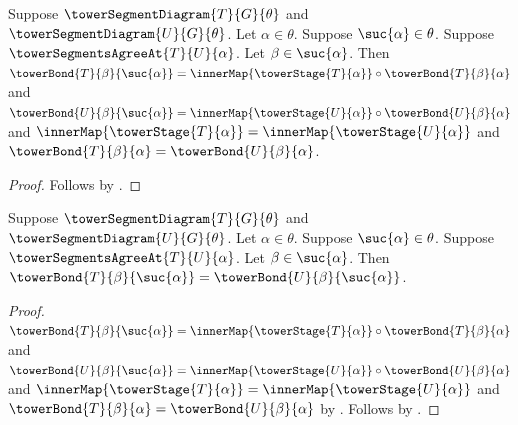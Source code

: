 \begin{proposition}\label{tower_successor_old_bond_agreement_factors}
    Suppose $\towerSegmentDiagram{T}{G}{\theta}$ and
        $\towerSegmentDiagram{U}{G}{\theta}$.
    Let $\alpha\in\theta$.
    Suppose $\suc{\alpha}\in\theta$.
    Suppose $\towerSegmentsAgreeAt{T}{U}{\alpha}$.
    Let $\beta\in\suc{\alpha}$.
    Then $\towerBond{T}{\beta}{\suc{\alpha}}=
            \innerMap{\towerStage{T}{\alpha}}\circ
                \towerBond{T}{\beta}{\alpha}$ and
        $\towerBond{U}{\beta}{\suc{\alpha}}=
            \innerMap{\towerStage{U}{\alpha}}\circ
                \towerBond{U}{\beta}{\alpha}$ and
        $\innerMap{\towerStage{T}{\alpha}}=
            \innerMap{\towerStage{U}{\alpha}}$ and
        $\towerBond{T}{\beta}{\alpha}=
            \towerBond{U}{\beta}{\alpha}$.
\end{proposition}
\begin{proof}
    Follows by
        .
\end{proof}

\begin{proposition}\label{tower_successor_old_bond_agreement}
    Suppose $\towerSegmentDiagram{T}{G}{\theta}$ and
        $\towerSegmentDiagram{U}{G}{\theta}$.
    Let $\alpha\in\theta$.
    Suppose $\suc{\alpha}\in\theta$.
    Suppose $\towerSegmentsAgreeAt{T}{U}{\alpha}$.
    Let $\beta\in\suc{\alpha}$.
    Then $\towerBond{T}{\beta}{\suc{\alpha}}=
        \towerBond{U}{\beta}{\suc{\alpha}}$.
\end{proposition}
\begin{proof}
    $\towerBond{T}{\beta}{\suc{\alpha}}=
            \innerMap{\towerStage{T}{\alpha}}\circ
                \towerBond{T}{\beta}{\alpha}$ and
        $\towerBond{U}{\beta}{\suc{\alpha}}=
            \innerMap{\towerStage{U}{\alpha}}\circ
                \towerBond{U}{\beta}{\alpha}$ and
        $\innerMap{\towerStage{T}{\alpha}}=
            \innerMap{\towerStage{U}{\alpha}}$ and
        $\towerBond{T}{\beta}{\alpha}=
            \towerBond{U}{\beta}{\alpha}$ by
        .
    Follows by .
\end{proof}

